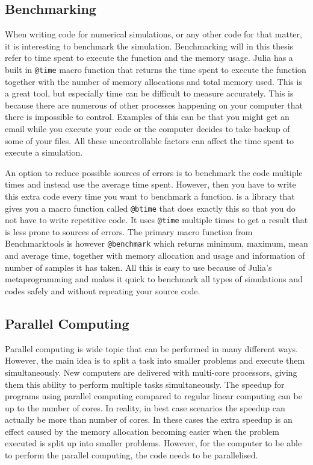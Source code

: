 \subsection{Benchmarking}
\label{sec:benchmarking}
When writing code for numerical simulations, or any other code for that matter, it is interesting to benchmark the simulation. Benchmarking will in this thesis refer to time spent to execute the function and the memory usage. Julia has a built in \texttt{@time} macro function \emph{\citep{@time}} that returns the time spent to execute the function together with the number of memory allocations and total memory used. This is a great tool, but especially time can be difficult to measure accurately. This is because there are numerous of other processes happening on your computer that there is impossible to control. Examples of this can be that you might get an email while you execute your code or the computer decides to take backup of some of your files. All these uncontrollable factors can affect the time spent to execute a simulation. 

An option to reduce possible sources of errors is to benchmark the code multiple times and instead use the average time spent. However, then you have to write this extra code every time you want to benchmark a function. \emph{\cite{BenchmarkTools}} is a library that gives you a macro function called \texttt{@btime} that does exactly this so that you do not have to write repetitive code. It uses \texttt{@time} multiple times to get a result that is less prone to sources of errors. The primary macro function from Benchmarktools is however \texttt{@benchmark} which returns minimum, maximum, mean and average time, together with memory allocation and usage and information of number of samples it has taken. All this is easy to use because of Julia's metaprogramming and makes it quick to benchmark all types of simulations and codes safely and without repeating your source code.

\subsection{Parallel Computing}
\label{sec:parallelComputing}
Parallel computing is wide topic that can be performed in many different ways. However, the main idea is to split a task into smaller problems and execute them simultaneously. New computers are delivered with multi-core processors, giving them this ability to perform multiple tasks simultaneously. The speedup for programs using parallel computing compared to regular linear computing can be up to the number of cores. In reality, in best case scenarios the speedup can actually be more than number of cores. In these cases the extra speedup is an effect caused by the memory allocation becoming easier when the problem executed is split up into smaller problems. However, for the computer to be able to perform the parallel computing, the code needs to be parallelised. 

